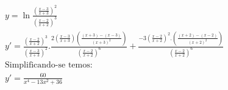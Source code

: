 \begin{ex}
\begin{align}
&y=\ln{\frac{\left(\frac{x-3}{x+3}\right)^2}{\left(\frac{x-2}{x+2}\right)^3}}\nonumber\\
&y'=\frac{\left(\frac{x-2}{x+2}\right)^3}{\left(\frac{x-3}{x+3}\right)^2}.\frac{2\left(\frac{x-3}{x+3}\right)\left(\frac{(x+3)-(x-3)}{(x+3)^2}\right)}{\left(\frac{x-2}{x+2}\right)^6}+\frac{-3\left(\frac{x-2}{x+2}\right)^2.\left(\frac{(x+2)-(x-2)}{(x+2)^2}\right)}{\left(\frac{x-2}{x+2}\right)^6}\nonumber\\
&\text{Simplificando-se temos:}\nonumber\\
&y'=\frac{60}{x^4-13x^2+36}\nonumber
\end{align}
\end{ex}